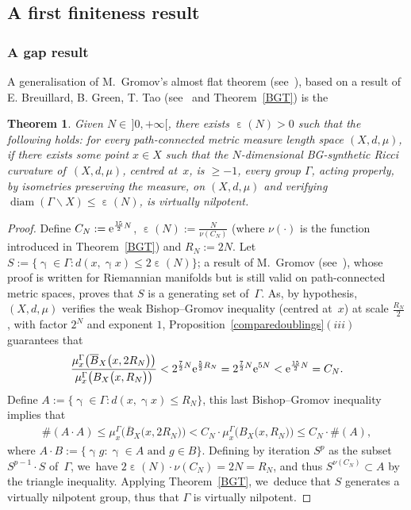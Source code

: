 \documentclass[10pt,a4paper]{amsart}
\numberwithin{equation}{section}
\newtheorem{theor}{Theorem}[section]
\newcommand{\diam}{\operatorname{diam}}
\newcommand{\g}{\operatorname{\gamma}}
\newcommand{\e}{\operatorname{\varepsilon}}
\begin{document}
\subsection{A first finiteness result}

\subsubsection{A gap result}
A generalisation of M.~Gromov's almost flat theorem (see~\cite{BK}), based on a result of E. Breuillard, B. Green, T. Tao (see~\cite[Corollary~11.2]{BGT} and Theorem~\ref{BGT}) is the


\begin{theor}%
Given $N \in \, ]0, +\infty [$, there exists $ \e(N) > 0$ such that the following holds: for every path-connected metric measure length space $(X,d, \mu)$, if there exists
some point $x \in X$ such that the $N$-dimensional BG-synthetic Ricci curvature of~$(X,d, \mu)$, centred at~$x$, is $\ge - 1$, every group $\Gamma$,
acting properly, by isometries preserving the measure, on $(X,d, \mu)$ and verifying $\diam (\Gamma \backslash X) \le \e(N)$, is virtually nilpotent.
\end{theor}



\begin{proof}
Define $C_N := {\rm e}^{\frac{15}{2} N} $, $\e(N) := \frac{N}{\nu (C_N)}$
(where $\nu (\cdot)$ is the function introduced in Theorem~\ref{BGT})
and $R_N := 2 N$.
Let $ S := \{\g \in \Gamma\colon d(x, \g x) \le 2 \e (N) \}$; a result of M.~Gromov
(see~\cite[Proposition~3.22]{Gr1}), whose proof is written for Riemannian manifolds but is still valid on path-connected metric spaces, proves that $S$ is a generating set of~$\Gamma$.
As, by hypothesis, $(X,d, \mu)$ verifies the weak Bishop--Gromov inequality (centred at~$x$) at scale $\frac{R_N}{2}$, with factor $2^N$ and exponent
$1$, Proposition~\ref{comparedoublings}$(iii)$ guarantees that
\begin{gather*}
\dfrac{\mu^\Gamma_x \big(\overline B_X \big(x, 2 R_N\big)\big)}{\mu^\Gamma_x \big(B_X \big(x, R_N\big)\big)} < 2^{\frac{7}{2} N} {\rm e}^{\frac{5}{2}R_N} = 2^{\frac{7}{2} N} {\rm e}^{5 N} < {\rm e}^{\frac{15}{2} N} = C_N.
\end{gather*}
Define $A := \{\g \in \Gamma\colon d(x, \g x) \le R_N\}$, this last Bishop--Gromov inequality implies that
\begin{gather*}
\# (A\cdot A) \le \mu^\Gamma_x \big( \overline B_X \big( x, 2 R_N\big)\big) < C_N \cdot \mu^\Gamma_x \big(B_X \big(x, R_N\big)\big) \le C_N \cdot \# (A),
\end{gather*}
where $A\cdot B := \{\g g \colon \g \in A \text{ and } g \in B\}$. Defining
by iteration $S^p$ as the subset $S^{p-1}\cdot S$ of~$\Gamma$, we~have
$2 \e(N) \cdot \nu (C_N) = 2 N = R_N$, and thus $S^{\nu (C_N)} \subset A$ by the triangle inequality.
Applying Theorem~\ref{BGT}, we~deduce that $S$ generates a virtually nilpotent group, thus that $\Gamma$ is virtually nilpotent.
\end{proof}
\end{document}
